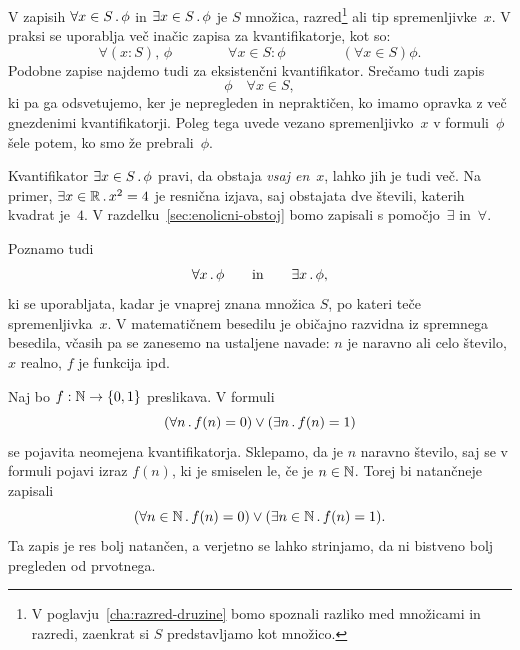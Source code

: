 V zapisih $\forall x \in S \,.\, \phi$ in $\exists x \in S \,.\, \phi$ je $S$ množica, razred\footnote{V poglavju~\ref{cha:razred-druzine} bomo spoznali razliko med množicami in razredi, zaenkrat si $S$
  predstavljamo kot množico.} ali tip spremenljivke~$x$. V praksi se
uporablja več inačic zapisa za kvantifikatorje, kot so:
%
\begin{equation*}
  \forall (x : S),\, \phi
  \qquad
  \qquad
  \forall x \in S : \phi
  \qquad
  \qquad
  (\forall x \in S) \phi.
\end{equation*}
%
Podobne zapise najdemo tudi za eksistenčni kvantifikator.
%
Srečamo tudi zapis
%
\begin{equation*}
  \phi\quad \forall x \in S,
\end{equation*}
%
ki pa ga odsvetujemo, ker je nepregleden in nepraktičen, ko imamo opravka z več gnezdenimi kvantifikatorji.
%
Poleg tega uvede vezano spremenljivko~$x$ v formuli~$\phi$ šele potem, ko smo že prebrali~$\phi$.

Kvantifikator $\exists x \in S \,.\, \phi$ pravi, da obstaja \emph{vsaj en}~$x$, lahko jih je tudi več.
Na primer, $\exists x \in \mathbb{R} \,.\, x^2 = 4$ je resnična izjava, saj obstajata dve števili, katerih kvadrat je~$4$.
%
V razdelku~\ref{sec:enolicni-obstoj} bomo zapisali  s pomočjo~$\exists$ in~$\forall$.

Poznamo tudi  
%
\begin{equation*}
  \forall x \,.\, \phi
  \qquad\text{in}\qquad
  \exists x \,.\, \phi,
\end{equation*}
%
ki se uporabljata, kadar je vnaprej znana množica $S$,
po kateri teče spremenljivka~$x$. V matematičnem besedilu je običajno
razvidna iz spremnega besedila, včasih pa se zanesemo na ustaljene navade:
$n$ je naravno ali celo število, $x$ realno, $f$ je funkcija ipd.

\begin{zgled}
  Naj bo $f : \mathbb{N} \to \left\{0, 1\right\}$ preslikava. V formuli
  \begin{equation*}
    (\forall n \,.\, f(n) = 0) \lor (\exists n \,.\, f(n) = 1)
  \end{equation*}
  se pojavita neomejena kvantifikatorja. Sklepamo, da je $n$ naravno število, saj se v formuli pojavi izraz $f(n)$,
  ki je smiselen le, če je $n \in \mathbb{N}$. Torej bi natančneje zapisali
  \begin{equation*}
    (\forall n \in \mathbb{N} \,.\, f(n) = 0) \lor (\exists n \in \mathbb{N} \,.\, f(n) = 1).
  \end{equation*}
  Ta zapis je res bolj natančen, a verjetno se lahko strinjamo, da ni bistveno bolj pregleden od prvotnega.
\end{zgled}


